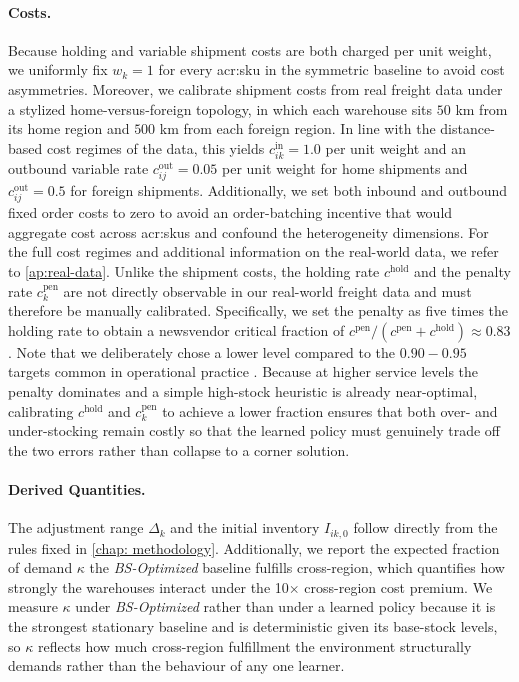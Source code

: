 \paragraph{\textbf{Costs.}} Because holding and variable shipment costs are both charged per unit weight, we uniformly fix $w_k=1$ for every \gls{acr:sku} in the symmetric baseline to avoid cost asymmetries. Moreover, we calibrate shipment costs from real freight data under a stylized home-versus-foreign topology, in which each warehouse sits $50$ km from its home region and $500$ km from each foreign region. In line with the distance-based cost regimes of the data, this yields $c^{\mathrm{in}}_{ik}=1.0$ per unit weight and an outbound variable rate $c^{\mathrm{out}}_{ij}=0.05$ per unit weight for home shipments and $c^{\mathrm{out}}_{ij}=0.5$ for foreign shipments. Additionally, we set both inbound and outbound fixed order costs to zero to avoid an order-batching incentive that would aggregate cost across \glspl{acr:sku} and confound the heterogeneity dimensions. For the full cost regimes and additional information on the real-world data, we refer to \autoref{ap:real-data}. Unlike the shipment costs, the holding rate $c^{\mathrm{hold}}$ and the penalty rate $c^{\mathrm{pen}}_k$ are not directly observable in our real-world freight data and must therefore be manually calibrated. Specifically, we set the penalty as five times the holding rate to obtain a newsvendor critical fraction of $c^{\mathrm{pen}}/(c^{\mathrm{pen}}+c^{\mathrm{hold}})\approx 0.83$.
Note that we deliberately chose a lower level compared to the $0.90-0.95$ targets common in operational practice \citep{silver2016inventory}. Because at higher service levels the penalty dominates and a simple high-stock heuristic is already near-optimal, calibrating $c^{\mathrm{hold}}$ and $c^{\mathrm{pen}}_k$ to achieve a lower fraction ensures that both over- and under-stocking remain costly so that the learned policy must genuinely trade off the two errors rather than collapse to a corner solution.

\paragraph{\textbf{Derived Quantities.}} The adjustment range $\Delta_k$ and the initial inventory $I_{ik,0}$ follow directly from the rules fixed in \autoref{chap: methodology}. Additionally, we report the expected fraction of demand $\kappa$ the \textit{BS-Optimized} baseline fulfills cross-region, which quantifies how strongly the warehouses interact under the 10$\times$ cross-region cost premium. We measure $\kappa$ under \textit{BS-Optimized} rather than under a learned policy because it is the
strongest stationary baseline and is deterministic given its base-stock levels, so $\kappa$ reflects how much cross-region fulfillment the environment structurally demands rather than the behaviour of any one learner.\\

